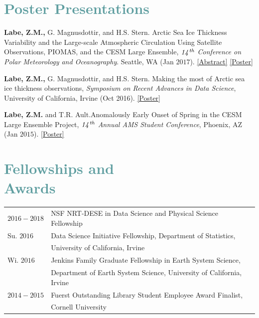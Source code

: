 \documentclass[margin,line,palatino,courier,10pt]{res}
\begin{document}
\begin{resume}
\begin{etaremune}[leftmargin=0in,topsep=0in,parsep=0in]
\end{etaremune}

\section{\sc \textcolor{CadetBlue}{\large{Poster Presentations}}}
\begin{etaremune}[leftmargin=0in,topsep=0in,parsep=0in]
\item \textbf{Labe, Z.M.,} G. Magnusdottir, and H.S. Stern. Arctic Sea Ice Thickness Variability and the Large-scale Atmospheric Circulation Using Satellite Observations, PIOMAS, and the CESM Large Ensemble, \textit{$\it{14^{th}}$ Conference on Polar Meteorology and Oceanography}. Seattle, WA (Jan $2017$). \href{https://ams.confex.com/ams/97Annual/webprogram/Paper313445.html}{[Abstract]} \href{http://sites.uci.edu/zlabe/files/2017/01/ZLabeMagnusdottirStern_AMSposter_2017.pdf}{[Poster]}

\item \textbf{Labe, Z.M.,} G. Magnusdottir, and H.S. Stern. Making the most of Arctic sea ice thickness observations, \textit{Symposium on Recent Advances in Data Science}, University of California, Irvine (Oct 2016). \href{http://sites.uci.edu/zlabe/files/2016/10/ZLabeMagnusdottirStern_DSIposter_Oct16.pdf}{[Poster]}

\item \textbf{Labe, Z.M.} and T.R. Ault.\@ Anomalously Early Onset of Spring in the CESM Large Ensemble Project, \textit{$\it{14^{th}}$ Annual AMS Student Conference}, Phoenix, AZ (Jan $2015$). \href{https://ams.confex.com/ams/95Annual/webprogram/Paper271063.html}{[Poster]} 

\end{etaremune}

\section{\sc \textcolor{CadetBlue}{\large{Fellowships and\\ Awards}}}
\vspace*{0.04in}
\begin{tabular}{@{}p{0.8in}p{4in}}
$2016-2018$ & NSF NRT-DESE in Data Science and Physical Science Fellowship\\
Su. $2016$ & Data Science Initiative Fellowship, Department of Statistics, \\
& University of California, Irvine\\
Wi. $2016$ & Jenkins Family Graduate Fellowship in Earth System Science,\\ 
& Department of Earth System
Science, University of California, Irvine\\
$2014-2015$ & Fuerst Outstanding Library Student Employee Award Finalist,\\
& Cornell University
\end{tabular}


\end{resume}
\end{document}
